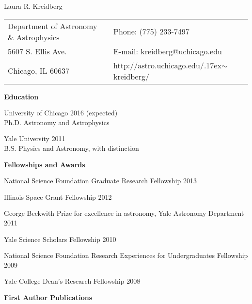 \documentclass[12pt,letterpaper]{article}
\def\name{Laura R. Kreidberg}
\renewenvironment{itemize}{
	\begin{list}{}{
	\setlength{\leftmargin}{1mm}%
	\setlength{\itemsep}{0pt}%
	\setlength{\parskip}{0pt}
	}
}{
	\end{list}
}
\begin{document}
\sloppy

{\huge \name}


\bigskip

\begin{tabular}{@{}p{4.0in}@{}p{5.0in}}
Department of Astronomy \& Astrophysics & Phone: (775) 233-7497 \\
5607 S. Ellis Ave.                      & E-mail: kreidberg@uchicago.edu\\ 
Chicago, IL 60637                       & http://astro.uchicago.edu/{\raise.17ex\hbox{$\scriptstyle\sim$}}kreidberg/ \\ 
\end{tabular}

\vspace{5mm}

\textbf{\large Education}
\vspace{-2mm}
\begin{itemize}
\item University of Chicago \hfill2016 (expected)\\
Ph.D. Astronomy and Astrophysics 
\item Yale University \hfill 2011 \\
B.S. Physics and Astronomy, with distinction
\end{itemize}

\vspace{3mm}
\textbf{\large Fellowships and Awards}
\vspace{2mm}
\begin{compactitem}[]
\item National Science Foundation Graduate Research Fellowship \hfill 2013
\item Illinois Space Grant Fellowship \hfill 2012
\item George Beckwith Prize for excellence in astronomy, Yale Astronomy Department \hfill2011
\item Yale Science Scholars Fellowship \hfill2010
\item National Science Foundation Research Experiences for Undergraduates Fellowship \hfill2009
\item Yale College Dean's Research Fellowship \hfill 2008
\end{compactitem}
\vspace{5mm}

\textbf{\large First Author Publications}
\vspace{-2 mm}
\end{document}
